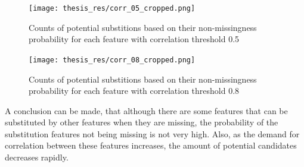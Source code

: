 \documentclass[11pt]{article}
\begin{document}
        \begin{figure}
          \centering
          \texttt{[image: thesis\_res/corr\_05\_cropped.png]}
          \caption{Counts of potential substitions based on their non-missingness probability for each feature with correlation threshold 0.5}
          \label{figure:corr_05}
        \end{figure}
        \newpage
        \begin{figure}
          \centering
          \texttt{[image: thesis\_res/corr\_08\_cropped.png]}
          \caption{Counts of potential substitions based on their non-missingness probability for each feature with correlation threshold 0.8}
          \label{figure:corr_08}
        \end{figure}
        \noindent A conclusion can be made, that although there are some features that can be substituted by other features when they are missing, the probability of the substitution features not being missing is not very high. Also, as the demand for correlation between these features increases, the amount of potential candidates decreases rapidly.
  \newpage
\end{document}
